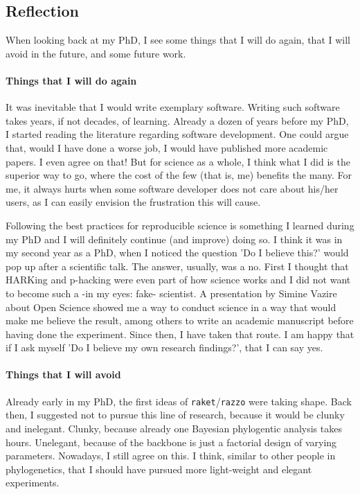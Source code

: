 \subsection{Reflection}

When looking back at my PhD, I see some things that I will
do again, that I will avoid in the future, and some future work.

\paragraph{Things that I will do again} 

It was inevitable that I would write exemplary software. Writing such
software takes years, if not decades, of learning. 
Already a dozen of years before my PhD, I started reading the literature
regarding software development. One could argue that, would I have done 
a worse job, I would have published more academic papers. I even agree
on that! But for science as a whole, I think what I did is the superior
way to go, where the cost of the few (that is, me) benefits the many. 
For me, it always hurts when some software developer does not
care about his/her users, as I can easily envision the frustration 
this will cause.

Following the best practices for reproducible science is something
I learned during my PhD and I will definitely continue (and improve)
doing so. I think it was in my second year as a PhD, 
when I noticed the question 'Do I believe this?' would pop up
after a scientific talk. The answer, usually, was a no. First I thought
that HARKing and p-hacking were even part of how science works
and I did not want to become such a -in my eyes: fake- scientist.
A presentation by Simine Vazire about Open Science showed me a way
to conduct science in a way that would make me believe the result,
among others to write an academic manuscript before having done
the experiment. Since then, I have taken that route. 
I am happy that if I ask myself 'Do I believe my own research findings?', 
that I can say yes.

\paragraph{Things that I will avoid} 

Already early in my PhD, the first ideas of \verb;raket;/\verb;razzo; were
taking shape. Back then, I suggested not to pursue this line of
research, because it would be clunky and inelegant. Clunky, because
already one Bayesian phylogentic analysis takes hours. Unelegant,
because of the backbone is just a factorial design of varying
parameters. Nowadays, I still agree on this.
I think, similar to other people in phylogenetics,
that I should have pursued more light-weight and elegant experiments.

